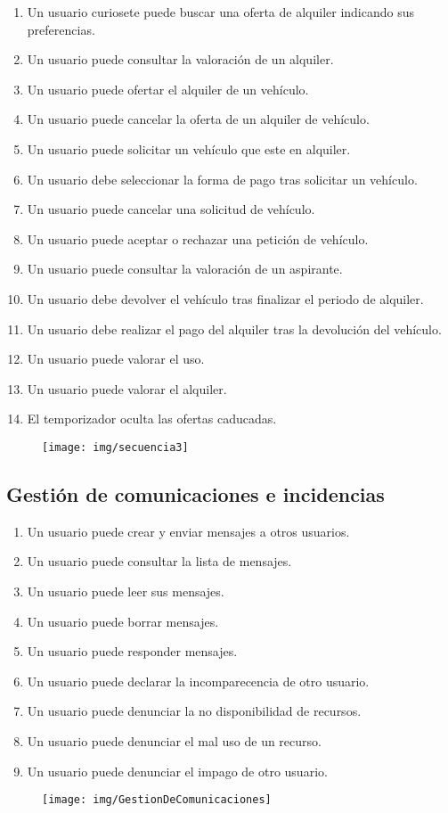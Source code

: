 		\begin{enumerate}
			\item Un usuario curiosete puede buscar una oferta de alquiler indicando sus preferencias.
			\item Un usuario puede consultar la valoración de un alquiler.
			\item Un usuario puede ofertar el alquiler de un vehículo.
			\item Un usuario puede cancelar la oferta de un alquiler de vehículo.
			\item Un usuario puede solicitar un vehículo que este en alquiler.
			\item Un usuario debe seleccionar la forma de pago tras solicitar un vehículo.
			\item Un usuario puede cancelar una solicitud de vehículo.
			\item Un usuario puede aceptar o rechazar una petición de vehículo.
			\item Un usuario puede consultar la valoración de un aspirante.
			\item Un usuario debe devolver el vehículo tras finalizar el periodo de alquiler.
			\item Un usuario debe realizar el pago del alquiler tras la devolución del vehículo.
			\item Un usuario puede valorar el uso.
			\item Un usuario puede valorar el alquiler.
			\item El temporizador oculta las ofertas caducadas.
		\end{enumerate}
		
		\begin{figure}[H]
			\centering
			\texttt{[image: img/secuencia3]}
			\label{fig:secuencia3}
		\end{figure}
		
		\subsection{Gestión de comunicaciones e incidencias}
		
		\begin{enumerate}
			\item Un usuario puede crear y enviar mensajes a otros usuarios.
			\item Un usuario puede consultar la lista de mensajes.
			\item Un usuario puede leer sus mensajes.
			\item Un usuario puede borrar mensajes.
			\item Un usuario puede responder mensajes.
			\item Un usuario puede declarar la incomparecencia de otro usuario.
			\item Un usuario puede denunciar la no disponibilidad de recursos.
			\item Un usuario puede denunciar el mal uso de un recurso.
			\item Un usuario puede denunciar el impago de otro usuario.
		\end{enumerate}

		\begin{figure}[H]
			\centering
			\texttt{[image: img/GestionDeComunicaciones]}
			\label{fig:gestiondecomunicaciones}
		\end{figure}





